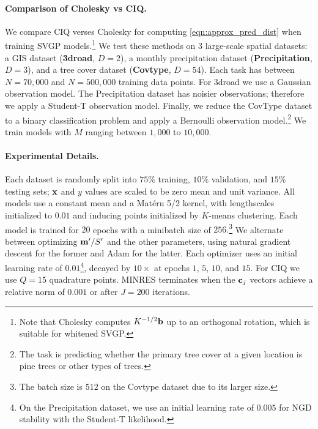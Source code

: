 \paragraph{Comparison of Cholesky vs CIQ.}
We compare CIQ verses Cholesky for computing \cref{eqn:approx_pred_dist} when training SVGP models.\footnote{
  Note that Cholesky computes $K^{-1/2} \mathbf{b}$ up to an orthogonal rotation, which is suitable for whitened SVGP.
}
We test these methods on 3 large-scale spatial datasets: a GIS dataset ({\bf 3droad}, $D=2$), a monthly precipitation dataset ({\bf Precipitation}, $D=3$), and a tree cover dataset ({\bf Covtype}, $D=54$).
Each task has between $N=70,\!000$ and $N=500,\!000$ training data points.
For 3droad we use a Gaussian observation model.
The Precipitation dataset has noisier observations; therefore we apply a Student-T observation model.
Finally, we reduce the CovType dataset to a binary classification problem and apply a Bernoulli observation model.\footnote{
  The task is predicting whether the primary tree cover at a given location is pine trees or other types of trees.
}
We train models with $M$ ranging between $1,\!000$ to $10,\!000$.

\paragraph{Experimental Details.}
Each dataset is randomly split into $75\%$ training, $10\%$ validation, and $15\%$ testing sets; $\mathbf{x}$ and $y$ values are scaled to be zero mean and unit variance.
All models use a constant mean and a Mat\'ern 5/2 kernel, with lengthscales initialized to $0.01$ and inducing points initialized by $K$-means clustering.
Each model is trained for $20$ epochs with a minibatch size of $256.$\footnote{
  The batch size is $512$ on the Covtype dataset due to its larger size.
}
We alternate between optimizing $\mathbf{m}'/S'$ and the other parameters, using natural gradient descent for the former and Adam \cite{kingma2014adam} for the latter.
Each optimizer uses an initial learning rate of $0.01$\footnote{
  On the Precipitation dataset, we use an initial learning rate of $0.005$ for  NGD stability with the Student-T likelihood.
}, decayed by $10\times$ at epochs $1$, $5$, $10$, and $15$.
For CIQ we use $Q = 15$ quadrature points.
MINRES terminates when the $\mathbf{c}_j$ vectors achieve a relative norm of $0.001$ or after $J=200$ iterations.

